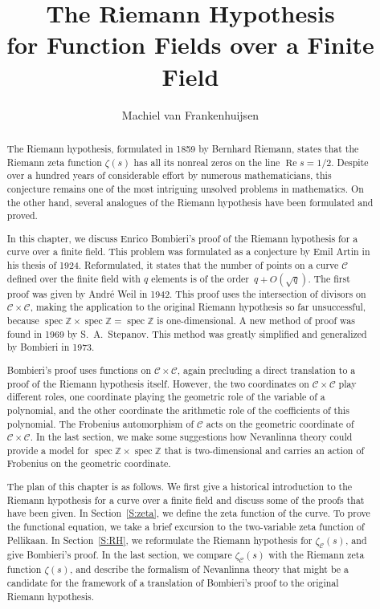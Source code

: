 \documentclass{amsart}
\renewcommand\Re{\operatorname*{Re}}	\renewcommand\Im{\operatorname*{Im}}
\newcommand\Z{\mathbb{Z}}	\newcommand\C{\mathbb{C}}
\newcommand\spec{\operatorname{spec}}
\newcommand\Curve{\mathcal{C}}
\theoremstyle{definition}\newtheorem{definition}[theorem]{Definition}
\theoremstyle{remark}\newtheorem{remark}[theorem]{Remark}
\numberwithin{equation}{section}
\begin{document}

\title[The Riemann Hypothesis for Function Fields over a Finite Field]{The Riemann Hypothesis\\
for Function Fields over a Finite Field}
\author{Machiel van Frankenhuijsen}
\address{Department of Mathematics,
Utah Valley University,
Orem, UT 84058-5999}


\begin{abstract}
The Riemann hypothesis,
formulated in 1859 by Bernhard Riemann,
states that the Riemann zeta function $\zeta(s)$ has all its nonreal zeros on the line $\Re s=1/2$.
Despite over a hundred years of considerable effort by numerous mathematicians,
this conjecture remains one of the most intriguing unsolved problems in mathematics.
On the other hand,
several analogues of the Riemann hypothesis have been formulated and proved.

In this chapter,
we discuss Enrico Bombieri's proof of the Riemann hypothesis for a curve over a finite field.
This problem was formulated as a conjecture by Emil Artin in his thesis of 1924.
Reformulated,
it states that the number of points on a curve $\Curve$ defined over the finite field with $q$ elements is of the order~$q+O(\sqrt{q})$.
The first proof was given by Andr\'e Weil in 1942.
This proof uses the intersection of divisors on $\Curve\times\Curve$,
making the application to the original Riemann hypothesis so far unsuccessful,
because $\spec\Z\times\spec\Z=\spec\Z$ is one-dimensional.
A new method of proof was found in 1969 by S.~A.~Stepanov.
This method was greatly simplified and generalized by Bombieri in 1973.

Bombieri's proof uses functions on $\Curve\times\Curve$,
again precluding a direct translation to a proof of the Riemann hypothesis itself.
However,
the two coordinates on $\Curve\times\Curve$ play different roles,
one coordinate playing the geometric role of the variable of a polynomial,
and the other coordinate the arithmetic role of the coefficients of this polynomial.
The Frobenius automorphism of $\Curve$ acts on the geometric coordinate of $\Curve\times\Curve$.
In the last section,
we make some suggestions how Nevanlinna theory could provide a model for $\spec\Z\times\spec\Z$ that is two-dimensional and carries an action of Frobenius on the geometric coordinate.

The plan of this chapter is as follows.
We first give a historical introduction to the Riemann hypothesis for a curve over a finite field and discuss some of the proofs that have been given.
In Section~\ref{S:zeta},
we define the zeta function of the curve.
To prove the functional equation,
we take a brief excursion to the two-variable zeta function of Pellikaan.
In Section~\ref{S:RH},
we reformulate the Riemann hypothesis for $\zeta_\Curve(s)$,
 and give Bombieri's proof.
In the last section,
we compare $\zeta_\Curve(s)$ with the Riemann zeta function $\zeta(s)$,
and describe the formalism of Nevanlinna theory that might be a candidate for the framework of a translation of Bombieri's proof to the original Riemann hypothesis.


\end{abstract}
\end{document}
